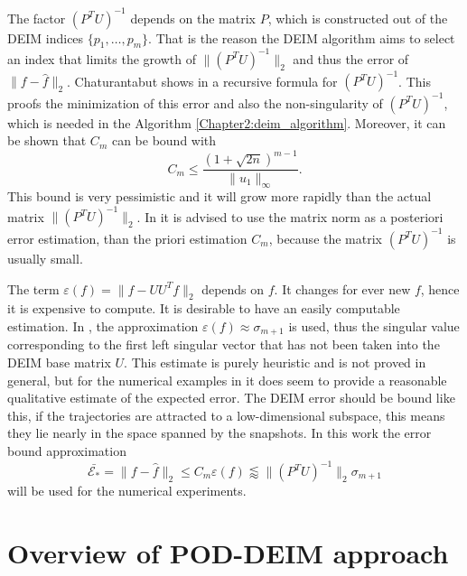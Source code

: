 The factor $(P^TU)^{-1}$ depends on the matrix $P$, which is constructed out of the DEIM indices 
$\{p_1,\dots,p_m\}$. That is the reason the DEIM algorithm aims to select an index that limits the 
growth of $\parallel (P^TU)^{-1} \parallel_2$ and thus the error of $\parallel f- \hat{f} \parallel_2$.
Chaturantabut shows in \cite{Chaturantabut2010Deim} a recursive formula for $(P^TU)^{-1}$. This proofs the minimization 
of this error and also the non-singularity of $(P^TU)^{-1}$, which is needed in the Algorithm \ref{Chapter2:deim_algorithm}.
Moreover, it can be shown that $C_m$ can be bound with 
\begin{equation}
 C_m \leq \frac{(1 + \sqrt{2n})^{m-1}}{\parallel u_1 \parallel_\infty}.
\end{equation} 
This bound is very pessimistic and it will grow more rapidly than the actual matrix $\parallel (P^TU)^{-1} \parallel_2$. In \cite{Chaturantabut2010Deim} it is advised to use the matrix norm as a posteriori error estimation, than the priori estimation
$C_m$, because the matrix $(P^TU)^{-1}$ is usually small. 

The term $\varepsilon(f) = \parallel f - UU^Tf \parallel_2$ depends on $f$. It changes for ever new $f$, hence 
it is expensive to compute. It is desirable to have an easily computable estimation.
In \cite{Chaturantabut2010Deim}, the approximation $\varepsilon(f)\approx \sigma_{m+1}$ is used, thus the singular value corresponding to the first left singular vector that has not been taken into the DEIM base matrix $U$.
This estimate is purely heuristic and is not proved in general, but for the numerical examples in \cite{Chaturantabut2010Deim} it does seem to provide a reasonable qualitative estimate of the
expected error. The DEIM error should be bound like this, if the trajectories are attracted to a low-dimensional subspace, this means they lie nearly in the space spanned by the snapshots.
In this work the error bound approximation 
\begin{equation}\label{ch2:error_bound_deim}
  \bar{\mathcal{E}_*} = \parallel f-\hat{f} \parallel_2 \leq C_m \varepsilon(f) \lessapprox \parallel (P^TU)^{-1} \parallel_2 \sigma_{m+1}
\end{equation}
 will be used for the numerical experiments. 



\section{Overview of POD-DEIM approach}
\label{overview}


